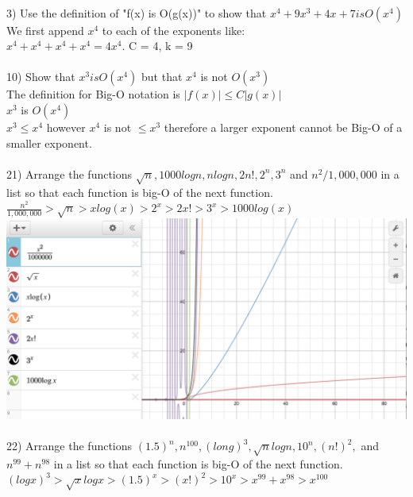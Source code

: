 \documentclass{article}
\begin{document}
\begin{flushleft}
~\\
\setlength\parindent{0pt}3) Use the definition of "f(x) is O(g(x))" to show that $x^4 + 9x^3 + 4x + 7 is O(x^4)$ \\
\setlength\parindent{24pt} We first append $x^4$ to each of the exponents like: \\
\setlength\parindent{24pt}$x^4 + x^4 + x^4 + x^4 = 4x^4$.  C = 4, k = 9 \\
~\\

\setlength\parindent{0pt}10) Show that $x^3 is O(x^4)$ but that $x^4$ is not $O(x^3)$ \\
\setlength\parindent{24pt} The definition for Big-O notation is $| f(x) | \leq C | g(x) |$ \\
\setlength\parindent{48pt} $x^3$ is $O(x^4)$ \\
\setlength\parindent{48pt} $x^3 \leq x^4$ however $x^4$ is not $\leq x^3$ therefore a larger exponent cannot be Big-O of a \\smaller exponent. \\
~\\
\setlength\parindent{0pt}21) Arrange the functions $\sqrt{n}, 1000logn, nlogn, 2n!, 2^n, 3^n$ and $n^2 / 1,000,000$ in a list so that each function is big-O of the next function. \\
\setlength\parindent{24pt} $\frac{n^2}{1,000,000} > \sqrt{n} > xlog(x) > 2^x > 2x! > 3^x > 1000log(x) $ \\
\setlength\parindent{0pt}\includegraphics[width=\textwidth]{graph.png} \\
~\\
\setlength\parindent{0pt}22) Arrange the functions $(1.5)^n, n^{100}, (long)^3, \sqrt{n}logn, 10^n, (n!)^2, $ and $n^{99} + n^{98}$ in a list so that each function is big-O of the next function. \\
\setlength\parindent{24pt} $(logx)^3 > \sqrt{x} log x > (1.5)^x > (x!)^2 > 10^x > x^{99} + x^{98} > x^{100}$ \\

\end{flushleft}
\end{document}
